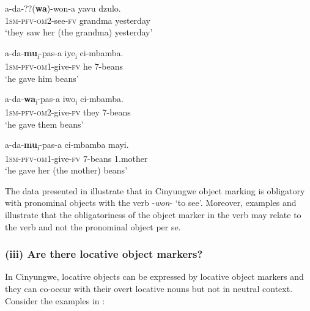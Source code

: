 \documentclass[output=paper]{langscibook}
\begin{document}
\ex\label{ex:ngunga:24c} \gll a-da-{??}(\textbf{wa})-won-a  yavu    dzulo.\\
  {\textsc{1sm}-\textsc{pfv}}{}-{\textsc{om}2}{}-see-{\textsc{fv}}  grandma  yesterday\\
\glt  ‘they saw her (the grandma) yesterday’
    \z
\z

\ea\label{ex:ngunga:25}
\ea\label{ex:ngunga:25a} \gll  a-da-\textbf{mu}\textsubscript{i}{}-pas-a  iye\textsubscript{i}  ci-mbamba.  \\
  {\textsc{1sm}-\textsc{pfv}}{}-{\textsc{om}1}{}-give-{\textsc{fv}}  he  7-beans\\
\glt  ‘he gave him beans’ 

\ex\label{ex:ngunga:25b} \gll a-da-\textbf{wa}\textsubscript{i}{}-pas-a  iwo\textsubscript{i}  ci-mbamba.  \\
  {\textsc{1sm}-\textsc{pfv}}{}-{\textsc{om}2}{}-give-{\textsc{fv}}  they  7-beans\\
\glt  ‘he gave them beans’

\ex\label{ex:ngunga:25c} \gll a-da-\textbf{mu}\textsubscript{i}{}-pas-a  ci-mbamba  mayi.  \\
{\textsc{1sm}-\textsc{pfv}}{}-{\textsc{om}1}{}-give-{\textsc{fv}}  7-beans  1.mother\\
\glt ‘he gave her (the mother) beans’
    \z
\z

The data presented in  illustrate that in Cinyungwe object marking is obligatory with pronominal objects with the verb -\textit{won}{}- ‘to see’. Moreover, examples  and  illustrate that the obligatoriness of the object marker in the verb may relate to the verb and not the pronominal object per se. 

\subsubsection{(iii) Are there locative object markers?}

In Cinyungwe, locative objects can be expressed by locative object markers and they can co-occur with their overt locative nouns but not in neutral context. Consider the examples in : 

\ea\label{ex:ngunga:26}
\end{document}
